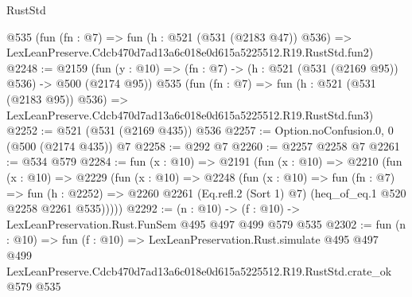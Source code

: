 \begin{lexlean}{RustStd}
\begin{coremodule}
    @535
    (fun (fn : @7) =>
    fun (h : @521 (@531 (@2183 @47)) @536) =>
    LexLeanPreserve.Cdcb470d7ad13a6c018e0d615a5225512.R19.RustStd.fun2)
@2248 := @2159
    (fun (y : @10) => (fn : @7) -> (h : @521 (@531 (@2169 @95)) @536) -> @500 (@2174 @95))
    @535
    (fun (fn : @7) =>
    fun (h : @521 (@531 (@2183 @95)) @536) =>
    LexLeanPreserve.Cdcb470d7ad13a6c018e0d615a5225512.R19.RustStd.fun3)
@2252 := @521 (@531 (@2169 @435)) @536
@2257 := Option.noConfusion.{0, 0} (@500 (@2174 @435)) @7
@2258 := @292 @7
@2260 := @2257 @2258 @7
@2261 := @534 @579
@2284 := fun (x : @10) =>
  @2191
    (fun (x : @10) =>
    @2210
      (fun (x : @10) =>
      @2229
        (fun (x : @10) =>
        @2248
          (fun (x : @10) =>
          fun (fn : @7) =>
          fun (h : @2252) =>
          @2260 @2261 (Eq.refl.{2} (Sort 1) @7) (heq_of_eq.{1} @520 @2258 @2261 @535)))))
@2292 := (n : @10) -> (f : @10) -> LexLeanPreservation.Rust.FunSem @495 @497 @499 @579 @535
@2302 := fun (n : @10) =>
  fun (f : @10) =>
  LexLeanPreservation.Rust.simulate
    @495
    @497
    @499
    LexLeanPreserve.Cdcb470d7ad13a6c018e0d615a5225512.R19.RustStd.crate_ok
    @579
    @535
\end{coremodule}
\end{lexlean}
